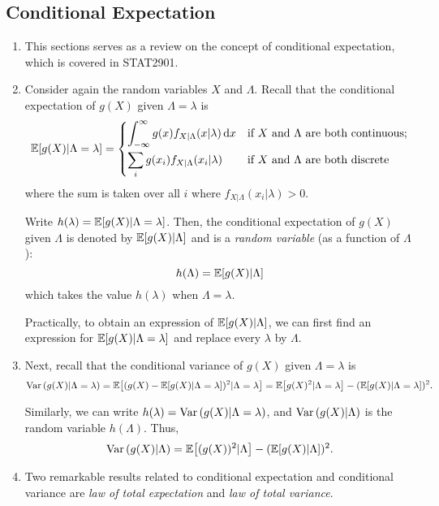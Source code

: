 \subsection{Conditional Expectation}
\begin{enumerate}
\item This sections serves as a review on the concept of conditional
expectation, which is covered in STAT2901.
\item Consider again the random variables \(X\) and \(\Lambda\). Recall that
the conditional expectation of \(g(X)\) given \(\Lambda=\lambda\) is
\[
\mathbb{E}\qty[g(X)|\Lambda=\lambda]=
\begin{cases}
\displaystyle
\int_{-\infty}^{\infty}g(x)f_{X|\Lambda}(x|\lambda)\dd{x}&\text{if \(X\) and \(\Lambda\) are both continuous};\\
\displaystyle
\sum_{i}^{}g(x_i)f_{X|\Lambda}(x_i|\lambda)&\text{if \(X\) and \(\Lambda\) are both discrete}\\
\end{cases}
\]
where the sum is taken over all \(i\) where \(f_{X|\Lambda}(x_i|\lambda)>0\).

Write \(h(\lambda)=\mathbb{E}\qty[g(X)|\Lambda=\lambda]\).  Then, the conditional
expectation of \(g(X)\) given \(\Lambda\) is denoted by \(\mathbb{E}\qty[g(X)|\Lambda]\)
and is a \emph{random variable} (as a function of \(\Lambda\)):
\[
h(\Lambda)=\mathbb{E}\qty[g(X)|\Lambda]
\]
which takes the value \(h(\lambda)\) when \(\Lambda=\lambda\).

\begin{note}
Practically, to obtain an expression of \(\mathbb{E}\qty[g(X)|\Lambda]\), we can first
find an expression for \(\mathbb{E}\qty[g(X)|\Lambda=\lambda]\) and replace every
\(\lambda\) by \(\Lambda\).
\end{note}
\item Next, recall that the conditional variance of \(g(X)\) given
\(\Lambda=\lambda\) is
\[
\operatorname{Var}\qty(g(X)|\Lambda=\lambda)
=\mathbb{E}\qty[(g(X)-\mathbb{E}\qty[g(X)|\Lambda=\lambda])^{2}|\Lambda=\lambda]
=\mathbb{E}\qty[g(X)^2|\Lambda=\lambda]-(\mathbb{E}\qty[g(X)|\Lambda=\lambda])^2.
\]
\begin{note}
Similarly, we can write \(h(\lambda)=\operatorname{Var}\qty(g(X)|\Lambda=\lambda)\), and
\(\operatorname{Var}\qty(g(X)|\Lambda)\) is the random variable \(h(\Lambda)\). Thus,
\[
\operatorname{Var}\qty(g(X)|\Lambda)=\mathbb{E}\qty[(g(X))^{2}|\Lambda]-(\mathbb{E}\qty[g(X)|\Lambda])^{2}.
\]
\end{note}
\item Two remarkable results related to conditional expectation and conditional
variance are \emph{law of total expectation} and \emph{law of total variance}.


\end{enumerate}
